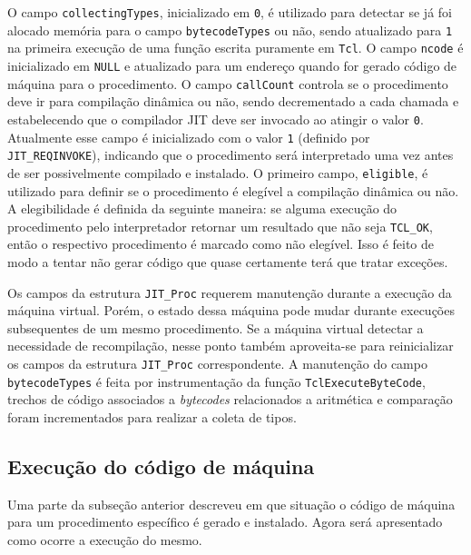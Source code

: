 O campo \verb!collectingTypes!, inicializado em \verb!0!, é utilizado para
detectar se já foi alocado memória para o campo \verb!bytecodeTypes!
ou não, sendo atualizado para \verb!1! na primeira execução de uma
função escrita puramente em \texttt{Tcl}. O campo \verb!ncode! é
inicializado em \verb!NULL! e atualizado para um endereço quando for
gerado código de máquina para o procedimento. O campo \verb!callCount!
controla se o procedimento deve ir para compilação dinâmica ou não,
sendo decrementado a cada chamada e estabelecendo que o compilador JIT
deve ser invocado ao atingir
o valor \verb!0!. Atualmente esse campo é inicializado com o valor
\verb!1! (definido por \verb!JIT_REQINVOKE!),
indicando que o procedimento será interpretado uma vez antes
de ser possivelmente compilado e instalado. O primeiro
campo, \verb!eligible!, é utilizado para definir se o
procedimento é elegível a compilação dinâmica ou não. A elegibilidade
é definida da seguinte maneira: se alguma execução do procedimento pelo
interpretador retornar um resultado que não seja \verb!TCL_OK!, então
o respectivo procedimento é marcado como não elegível. Isso é feito de
modo a tentar não gerar código que quase certamente terá que
tratar exceções.

Os campos da estrutura \verb!JIT_Proc! requerem
manutenção durante a execução da máquina virtual. Porém, o estado dessa
máquina pode mudar durante execuções subsequentes de um mesmo
procedimento. Se a máquina virtual detectar a necessidade de
recompilação, nesse ponto também aproveita-se para reinicializar os
campos da estrutura \verb!JIT_Proc!
correspondente. A manutenção do campo \verb!bytecodeTypes! é feita por
instrumentação da função \verb!TclExecuteByteCode!,
trechos de código associados a \textit{bytecodes}
relacionados a aritmética e comparação foram incrementados para
realizar a coleta de tipos.


\subsection{Execução do código de máquina}
\label{codeexec}
Uma parte da subseção anterior descreveu em que situação o código de
máquina para um procedimento específico é gerado e instalado. Agora será
apresentado como ocorre a execução do mesmo.

